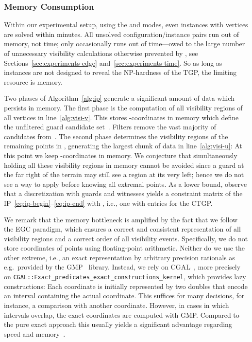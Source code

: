 \subsubsection{Memory Consumption}
\label{sec:experiments-memory}

Within our experimental setup, using the \vdefault and \pdefault modes, even instances with  vertices are solved within minutes.
All unsolved configuration/instance pairs run out of memory, not time;
only \pnoedge occasionally runs out of time\dash---owed to the large number of unnecessary visibility calculations otherwise prevented by \pointguardfilter, see Sections~\ref{sec:experiments-edge} and~\ref{sec:experiments-time}.
So as long as instances are not designed to reveal the NP-hardness of the \ac{TGP}, the limiting resource is memory.

Two phases of Algorithm~\ref{alg:ip} generate a significant amount of data which persists in memory.
The first phase is the computation of all visibility regions of all vertices  in line~\ref{alg:visi-v}.
This stores  -coordinates in memory which define the unfiltered guard candidate set~.
Filters remove the vast majority of candidates from~.
The second phase determines the visibility regions of the remaining points in , generating the largest chunk of data in line~\ref{alg:visi-u}:
At this point we keep  -coordinates in memory.
We conjecture that simultaneously holding all these visibility regions in memory cannot be avoided since a guard at the far right of the terrain may still see a region at its very left;
hence we do not see a way to apply \witnessfilter before knowing all extremal points.
As a lower bound, observe that a discretization with guards  and witnesses  yields a constraint matrix  of the \acs{IP}~\eqref{eq:ip-begin}--\eqref{eq:ip-end} with , i.e., one with  entries for the \ac{CTGP}.

We remark that the memory bottleneck is amplified by the fact that we follow the \ac{EGC} paradigm, which ensures a correct and consistent representation of all visibility regions and a correct order of all visibility events.
Specifically, we do not store coordinates of points using floating-point arithmetic.
Neither do we use the other extreme, i.e., an exact representation by arbitrary precision rationals as e.g.\ provided by the GMP~\cite{gmp} library.
Instead, we rely on \ac{CGAL}~\cite{cgal}, more precisely on \texttt{CGAL::Exact\_predicates\_exact\_constructions\_kernel}, which provides lazy constructions:
Each coordinate is initially represented by two doubles that encode an interval containing the actual coordinate.
This suffices for many decisions, for instance, a comparison with another coordinate.
However, in cases in which intervals overlap, the exact coordinates are computed with GMP.
Compared to the pure exact approach this usually yields a significant advantage regarding speed and memory~\cite{pf-aglesfegc-2011}.
